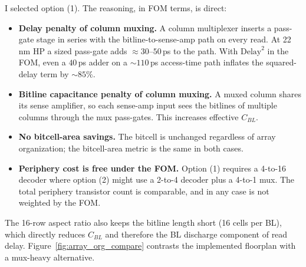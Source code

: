 \documentclass[11pt]{article}
\begin{document}
I selected option (1). The reasoning, in FOM terms, is direct:

\begin{itemize}
\item \textbf{Delay penalty of column muxing.} A column multiplexer
  inserts a pass-gate stage in series with the bitline-to-sense-amp
  path on every read. At 22\,nm HP a sized pass-gate adds
  $\approx 30$--$50$\,ps to the path. With $\mathrm{Delay}^2$ in the
  FOM, even a $40$\,ps adder on a $\sim 110$\,ps access-time path inflates the
  squared-delay term by $\sim\!85\%$.
\item \textbf{Bitline capacitance penalty of column muxing.} A muxed
  column shares its sense amplifier, so each sense-amp input sees the
  bitlines of multiple columns through the mux pass-gates. This
  increases effective $C_{BL}$.
\item \textbf{No bitcell-area savings.} The bitcell is unchanged
  regardless of array organization; the bitcell-area metric is the
  same in both cases.
\item \textbf{Periphery cost is free under the FOM.} Option (1)
  requires a 4-to-16 decoder where option (2) might use a 2-to-4
  decoder plus a 4-to-1 mux. The total periphery transistor count is
  comparable, and in any case is not weighted by the FOM.
\end{itemize}

The 16-row aspect ratio also keeps the bitline length short (16 cells
per BL), which directly reduces $C_{BL}$ and therefore the BL
discharge component of read delay.
Figure~\ref{fig:array_org_compare} contrasts the implemented floorplan
with a mux-heavy alternative.
\end{document}
